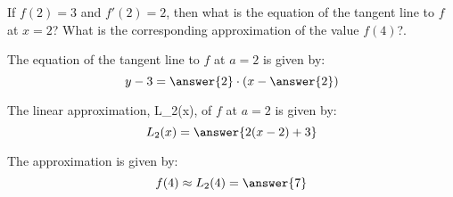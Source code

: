 \documentclass{ximera}
\author{Steven Gubkin}
\begin{document}
\begin{exercise}
If $f(2)=3$ and $f'(2) = 2$, then what is the equation of the tangent line to $f$ at $x=2$? What is the
corresponding approximation of the value $f(4)$?.

\begin{prompt}
The equation of the tangent line to $f$ at $a=2$ is given by:
 \[ y-3 = \answer{2}\cdot(x-\answer{2})\]
 
The linear approximation, L_2(x), of $f$ at $a=2$ is given by:
 \[L_2(x) = \answer{2(x-2)+3}\]
  
 The approximation is given by:
\[ f(4) \approx L_2(4)= \answer{7}\]
\end{prompt}

\end{exercise}
\end{document}
